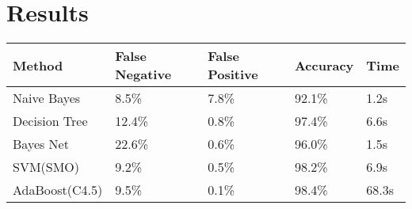 \section{Results}
\begin{tabular}{|l|l l l l|}
\hline
Method & False Negative & False Positive & Accuracy & Time \\
\hline
Naive Bayes & 8.5\% & 7.8\% & 92.1\% & 1.2s \\
Decision Tree & 12.4\% & 0.8\% & 97.4\% & 6.6s \\
Bayes Net & 22.6\% & 0.6\% & 96.0\% & 1.5s \\
SVM(SMO) & 9.2\% & 0.5\% & 98.2\% & 6.9s \\
AdaBoost(C4.5) & 9.5\% & 0.1\% & 98.4\% & 68.3s \\
\hline
\end{tabular}
